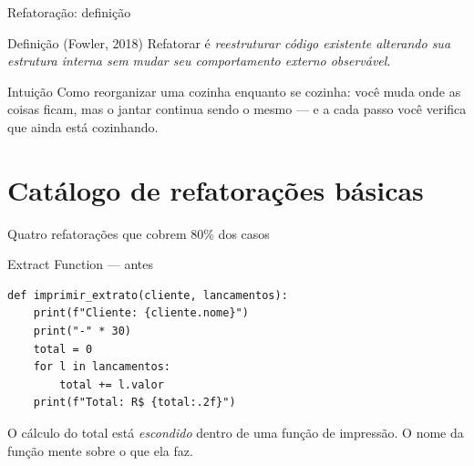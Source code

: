 \documentclass[aspectratio=169]{beamer}
\begin{document}
\begin{frame}{Refatoração: definição}
  \begin{block}{Definição (Fowler, 2018)}
    Refatorar é \emph{reestruturar código existente alterando sua estrutura
    interna sem mudar seu comportamento externo observável}.
  \end{block}
  \begin{exampleblock}{Intuição}
    Como reorganizar uma cozinha enquanto se cozinha: você muda onde as
    coisas ficam, mas o jantar continua sendo o mesmo --- e a cada passo
    você verifica que ainda está cozinhando.
  \end{exampleblock}
\end{frame}

\section{Catálogo de refatorações básicas}

\begin{frame}{Quatro refatorações que cobrem 80\% dos casos}
  \begin{center}
  \end{center}
  \vfill
  \begin{center}
  \quad
  \end{center}
\end{frame}

\begin{frame}[fragile]{Extract Function --- antes}
\begin{lstlisting}
def imprimir_extrato(cliente, lancamentos):
    print(f"Cliente: {cliente.nome}")
    print("-" * 30)
    total = 0
    for l in lancamentos:
        total += l.valor
    print(f"Total: R$ {total:.2f}")
\end{lstlisting}
\small O cálculo do total está \emph{escondido} dentro de uma função de
impressão. O nome da função mente sobre o que ela faz.
\end{frame}
\end{document}
